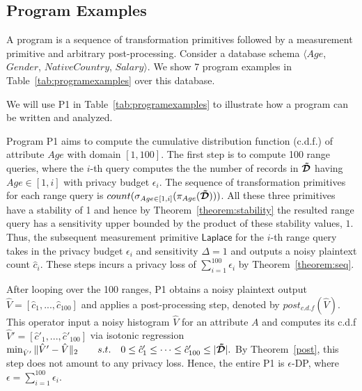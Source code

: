 \subsection{Program Examples}
A \system program is a sequence of transformation primitives followed by a measurement primitive and arbitrary post-processing. Consider a database schema $\langle Age$, $Gender$, $NativeCountry$, $Salary\rangle$. We show 7 \system program examples in Table~\ref{tab:programexamples} over this database.

We will use P1 in Table~\ref{tab:programexamples} to illustrate how a \system program can be written and  analyzed. 

Program P1 aims to compute the cumulative distribution function (c.d.f.) of attribute $Age$ with domain $[1,100]$. The first step is to compute 100 range queries, where the $i$-th query computes the the number of records in $\boldsymbol{\tilde{\mathcal{D}}}$ having $Age \in [1,i]$ with privacy budget $\epsilon_i$.  The sequence of transformation primitives for each range query is $count(\sigma_{Age\in [1,i]}(\pi_{Age}(\boldsymbol{\tilde{\mathcal{D}}})))$. All these three primitives have a stability of 1 and hence by Theorem~\ref{theorem:stability} the resulted range query has a sensitivity upper bounded by the product of these stability values, $1$. Thus, the subsequent measurement primitive $\textsf{Laplace}$ for the $i$-th range query takes in the privacy budget $\epsilon_i$ and sensitivity $\Delta=1$ and outputs a noisy plaintext count $\hat{c}_i$. These steps incurs a privacy loss of $\sum_{i=1}^{100} \epsilon_i$ by Theorem~\ref{theorem:seq}.

After looping over the 100 ranges, P1 obtains a  noisy plaintext output $\hat{V}=[\hat{c}_1,...,\hat{c}_{100}]$ and applies a post-processing step, denoted by $post_{c.d.f}(\hat{V})$. This operator input a noisy histogram $\hat{V}$ for an attribute $A$ and computes its c.d.f $\hat{V}'=[\hat{c}'_1,...,\hat{c}'_{100}]$ via isotonic regression 
$\min_{\hat{V}'} \|\hat{V}'-\hat{V}\|_2 ~~~~~~s.t.~~~ 0\leq\hat{c}'_1\leq \cdots \leq \hat{c}'_{100} \leq |\boldsymbol{\tilde{\mathcal{D}}}|.$
By Theorem~\ref{post}, this step does not amount to any privacy loss. Hence, the entire P1 is $\epsilon$-DP, where $\epsilon=\sum_{i=1}^{100} \epsilon_i$. 

